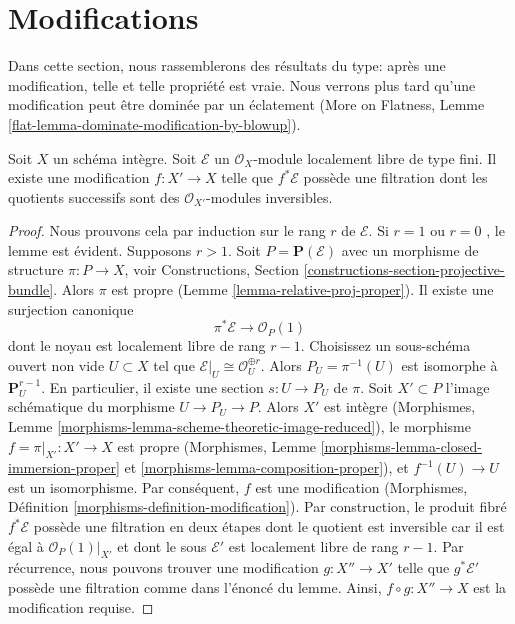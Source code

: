 \section{Modifications}
\label{section-modifications}

\noindent
Dans cette section, nous rassemblerons des résultats du type: après une
modification, telle et telle propriété est vraie. Nous verrons plus tard qu'une
modification peut être dominée par un éclatement (More on Flatness, Lemme
 \ref{flat-lemma-dominate-modification-by-blowup}).

\begin{lemma}
\label{lemma-filter-after-modification}
Soit  $X$  un schéma intègre. Soit  $\mathcal{E}$  un  $\mathcal{O}_X$-module
localement libre de type fini. Il existe une modification  $f : X' \to X$  telle que
 $f^*\mathcal{E}$  possède une filtration dont les quotients successifs sont des
 $\mathcal{O}_{X'}$-modules inversibles.
\end{lemma}

\begin{proof}
Nous prouvons cela par induction sur le rang  $r$  de  $\mathcal{E}$. Si
 $r = 1$  ou  $r = 0$ , le lemme est évident. Supposons  $r > 1$. Soit
 $P = \mathbf{P}(\mathcal{E})$  avec un morphisme de structure  $\pi : P \to X$, voir Constructions,
Section  \ref{constructions-section-projective-bundle}. Alors  $\pi$  est propre (Lemme  \ref{lemma-relative-proj-proper}). Il
existe une surjection canonique
$$
\pi^*\mathcal{E} \to \mathcal{O}_P(1)
$$
dont le noyau est localement libre de rang  $r - 1$. Choisissez un sous-schéma
ouvert non vide  $U \subset X$  tel que  $\mathcal{E}|_U \cong \mathcal{O}_U^{\oplus r}$. Alors  $P_U = \pi^{-1}(U)$  est
isomorphe à  $\mathbf{P}^{r - 1}_U$. En particulier, il existe une section  $s : U \to P_U$  de
 $\pi$. Soit  $X' \subset P$  l'image schématique du morphisme  $U \to P_U \to P$.
Alors  $X'$  est intègre (Morphismes, Lemme  \ref{morphisms-lemma-scheme-theoretic-image-reduced}), le morphisme
 $f = \pi|_{X'} : X' \to X$  est propre (Morphismes, Lemme  \ref{morphisms-lemma-closed-immersion-proper}  et  \ref{morphisms-lemma-composition-proper}), et
 $f^{-1}(U) \to U$  est un isomorphisme. Par conséquent,  $f$  est une
modification (Morphismes, Définition  \ref{morphisms-definition-modification}). Par construction, le produit
fibré  $f^*\mathcal{E}$  possède une filtration en deux étapes dont le quotient est
inversible car il est égal à  $\mathcal{O}_P(1)|_{X'}$  et dont le sous  $\mathcal{E}'$  est
localement libre de rang  $r - 1$. Par récurrence, nous pouvons trouver une
modification  $g : X'' \to X'$  telle que  $g^*\mathcal{E}'$  possède une filtration comme dans
l'énoncé du lemme. Ainsi,  $f \circ g : X'' \to X$  est la modification requise.
\end{proof}

